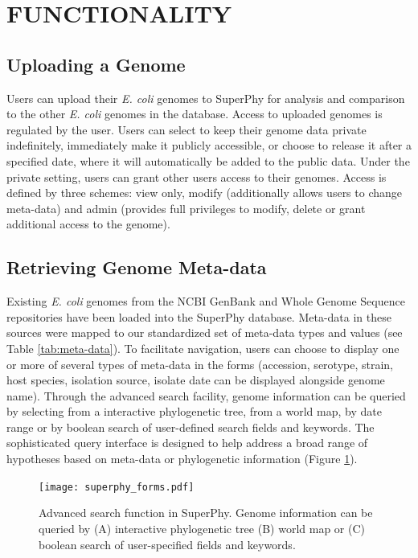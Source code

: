 \documentclass[a4paper,twoside]{article}
\begin{document}
\section{\uppercase{Functionality}}
\label{sec:functionality}

\subsection{Uploading a Genome}

Users can upload their \textit{E. coli} genomes to SuperPhy for analysis and comparison to the other \textit{E. coli} genomes in the database.  Access to uploaded genomes is regulated by the user. Users can select to keep their genome data private indefinitely, immediately make it publicly accessible, or choose to release it after a specified date, where it will automatically be added to the public data.  Under the private setting, users can grant other users access to their genomes.  Access is defined by three schemes: view only, modify (additionally allows users to change meta-data) and admin (provides full privileges to modify, delete or grant additional access to the genome).

\subsection{Retrieving Genome Meta-data}

Existing \textit{E. coli} genomes from the NCBI GenBank and Whole Genome Sequence repositories \cite{benson2013genbank} have been loaded into the SuperPhy database. Meta-data in these sources were mapped to our standardized set of meta-data types and values (see Table \ref{tab:meta-data}). To facilitate navigation,
users can choose to display one or more of several types of meta-data in the forms (accession, serotype, strain, host species, isolation source, isolate date can be displayed alongside genome name). Through the advanced search facility, genome information can be queried by selecting from a interactive phylogenetic tree, from a world map, by date range or by boolean search of user-defined search fields and keywords.  The sophisticated query interface is designed to help address a broad range of hypotheses based on meta-data or phylogenetic information (Figure \ref{fig:search}).

\begin{figure}[t]
  \vspace{-0.2cm}
  \centering
   {\texttt{[image: superphy\_forms.pdf]}}
  \caption{Advanced search function in SuperPhy. Genome information can be queried by (A) interactive phylogenetic tree (B) world map or (C) boolean search of user-specified fields and keywords.}
  \label{fig:search}
\end{figure}
\end{document}

